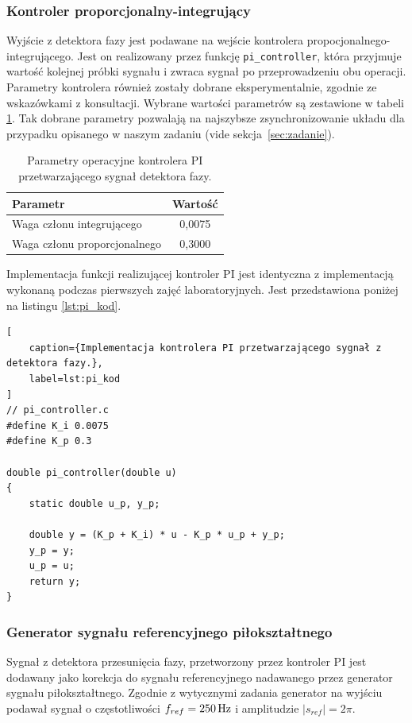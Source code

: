 \subsubsection{Kontroler proporcjonalny-integrujący}
\label{sec:pi}
Wyjście z detektora fazy jest podawane na wejście kontrolera propocjonalnego-
integrującego. Jest on realizowany przez funkcję \texttt{pi\_controller}, która
przyjmuje wartość kolejnej próbki sygnału i zwraca sygnał po przeprowadzeniu obu
operacji. Parametry kontrolera również zostały dobrane eksperymentalnie, zgodnie
ze wskazówkami z konsultacji. Wybrane wartości parametrów są zestawione w
tabeli \ref{tab:pi_parametry}. Tak dobrane parametry pozwalają na najszybsze
zsynchronizowanie układu dla przypadku opisanego w naszym zadaniu
(vide sekcja~\ref{sec:zadanie}).

\begin{table}[h]
    \centering
    \begin{tabular}{lc}
        \toprule
        \textbf{Parametr} & \textbf{Wartość} \\
        \midrule
        Waga członu integrującego & 0,0075 \\
        Waga członu proporcjonalnego & 0,3000 \\
        \bottomrule
    \end{tabular}
    \caption{Parametry operacyjne kontrolera PI przetwarzającego sygnał detektora fazy.}
    \label{tab:pi_parametry}
\end{table}

\noindent Implementacja funkcji realizującej kontroler PI jest identyczna z
implementacją wykonaną podczas pierwszych zajęć laboratoryjnych. Jest
przedstawiona poniżej na listingu \ref{lst:pi_kod}.

\begin{lstlisting}[
    caption={Implementacja kontrolera PI przetwarzającego sygnał z detektora fazy.},
    label=lst:pi_kod
]
// pi_controller.c
#define K_i 0.0075
#define K_p 0.3

double pi_controller(double u)
{
    static double u_p, y_p;

    double y = (K_p + K_i) * u - K_p * u_p + y_p;
    y_p = y;
    u_p = u;
    return y;
}
\end{lstlisting}

\subsubsection{Generator sygnału referencyjnego piło\dywiz kształtnego}
\label{sec:generator}
Sygnał z detektora przesunięcia fazy, przetworzony przez kontroler PI jest
dodawany jako korekcja do sygnału referencyjnego nadawanego przez generator
sygnału piło\dywiz kształtnego. Zgodnie z wytycznymi zadania generator na
wyjściu podawał sygnał o częstotliwości $f_{ref} = \unit[250]{Hz}$ i amplitudzie
$|s_{ref}| = 2\pi$.

